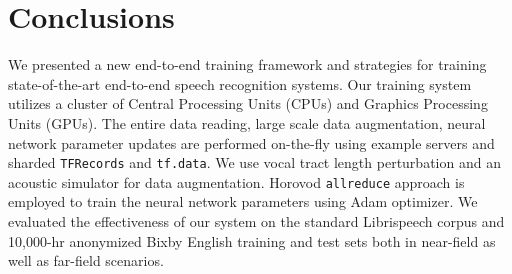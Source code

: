 \documentclass{article}
\begin{document}
\section{Conclusions}
\label{sec:conclusions}
We presented a new end-to-end training framework and
 strategies for training 
state-of-the-art end-to-end speech recognition systems.
Our training system utilizes a cluster of Central Processing Units 
  (CPUs) and Graphics Processing Units (GPUs).
The entire data reading, large scale data augmentation,
neural network parameter updates are performed on-the-fly
using example servers and sharded {\tt TFRecords} and {\tt tf.data}. 
  We use vocal tract length perturbation and an acoustic simulator 
for data augmentation. Horovod {\tt allreduce} approach is employed 
to train the neural network parameters using Adam optimizer.
We evaluated the effectiveness of our system on the standard 
Librispeech corpus \cite{v_panayotov_icassp_2015_00} and 
  10,000-hr anonymized Bixby English training 
 and test sets both in near-field as well as
far-field scenarios.  


\end{document}
